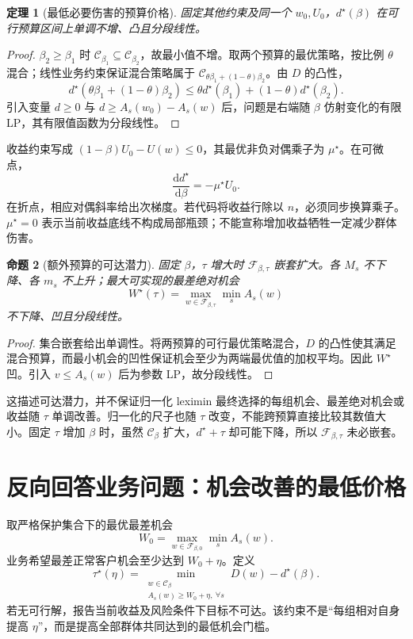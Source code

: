 \documentclass[UTF8,11pt,fontset=fandol]{ctexart}
\newtheorem{theorem}{定理}[section]
\newtheorem{proposition}[theorem]{命题}
\newcommand{\C}{\mathcal C}
\newcommand{\F}{\mathcal F}
\begin{document}
\begin{theorem}[最低必要伤害的预算价格]
固定其他约束及同一个 $w_0,U_0$，$d^\star(\beta)$ 在可行预算区间上单调不增、凸且分段线性。
\end{theorem}
\begin{proof}
$\beta_2\ge\beta_1$ 时 $\C_{\beta_1}\subseteq\C_{\beta_2}$，故最小值不增。取两个预算的最优策略，按比例 $\theta$ 混合；线性业务约束保证混合策略属于 $\C_{\theta\beta_1+(1-\theta)\beta_2}$。由 $D$ 的凸性，
\[
d^\star(\theta\beta_1+(1-\theta)\beta_2)
\le\theta d^\star(\beta_1)+(1-\theta)d^\star(\beta_2).
\]
引入变量 $d\ge0$ 与 $d\ge A_s(w_0)-A_s(w)$ 后，问题是右端随 $\beta$ 仿射变化的有限 LP，其有限值函数为分段线性。
\end{proof}
收益约束写成 $(1-\beta)U_0-U(w)\le0$，其最优非负对偶乘子为 $\mu^\star$。在可微点，
\[
\frac{\mathrm d d^\star}{\mathrm d\beta}=-\mu^\star U_0.
\]
在折点，相应对偶斜率给出次梯度。若代码将收益行除以 $n$，必须同步换算乘子。$\mu^\star=0$ 表示当前收益底线不构成局部瓶颈；不能宣称增加收益牺牲一定减少群体伤害。

\begin{proposition}[额外预算的可达潜力]
固定 $\beta$，$\tau$ 增大时 $\F_{\beta,\tau}$ 嵌套扩大。各 $M_s$ 不下降、各 $m_s$ 不上升；最大可实现的最差绝对机会
\[
W^\star(\tau)=\max_{w\in\F_{\beta,\tau}}\min_sA_s(w)
\]
不下降、凹且分段线性。
\end{proposition}
\begin{proof}
集合嵌套给出单调性。将两预算的可行最优策略混合，$D$ 的凸性使其满足混合预算，而最小机会的凹性保证机会至少为两端最优值的加权平均。因此 $W^\star$ 凹。引入 $v\le A_s(w)$ 后为参数 LP，故分段线性。
\end{proof}
这描述可达潜力，并不保证归一化 leximin 最终选择的每组机会、最差绝对机会或收益随 $\tau$ 单调改善。归一化的尺子也随 $\tau$ 改变，不能跨预算直接比较其数值大小。固定 $\tau$ 增加 $\beta$ 时，虽然 $\C_\beta$ 扩大，$d^\star+\tau$ 却可能下降，所以 $\F_{\beta,\tau}$ 未必嵌套。

\section{反向回答业务问题：机会改善的最低价格}
取严格保护集合下的最优最差机会
\[
W_0=\max_{w\in\F_{\beta,0}}\min_sA_s(w).
\]
业务希望最差正常客户机会至少达到 $W_0+\eta$。定义
\[
\boxed{\tau^\star(\eta)=
\min_{\substack{w\in\C_\beta\\A_s(w)\ge W_0+\eta,\ \forall s}}
D(w)-d^\star(\beta).}
\]
若无可行解，报告当前收益及风险条件下目标不可达。该约束不是“每组相对自身提高 $\eta$”，而是提高全部群体共同达到的最低机会门槛。
\end{document}
